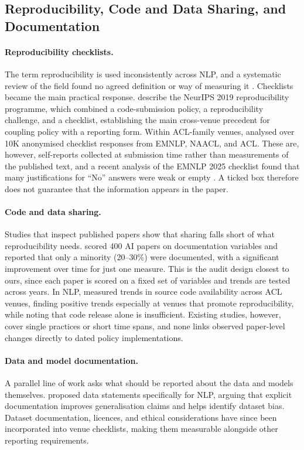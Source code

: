 \documentclass[11pt]{article}
\begin{document}
\subsection{Reproducibility, Code and Data Sharing, and Documentation}

\paragraph{Reproducibility checklists.}
The term reproducibility is used inconsistently across NLP, and a systematic review of the field found no agreed definition or way of measuring it \cite{belz2021systematic}. Checklists became the main practical response.  describe the NeurIPS 2019 reproducibility programme, which combined a code-submission policy, a reproducibility challenge, and a checklist, establishing the main cross-venue precedent for coupling policy with a reporting form. Within ACL-family venues,  analysed over 10K anonymised checklist responses from EMNLP, NAACL, and ACL. These are, however, self-reports collected at submission time rather than measurements of the published text, and a recent analysis of the EMNLP 2025 checklist found that many justifications for ``No'' answers were weak or empty \cite{jinnath2026aclresponsiblenlpchecklist}. A ticked box therefore does not guarantee that the information appears in the paper.

\paragraph{Code and data sharing.}
Studies that inspect published papers show that sharing falls short of what reproducibility needs.  scored 400 AI papers on documentation variables and reported that only a minority (20--30\%) were documented, with a significant improvement over time for just one measure. This is the audit design closest to ours, since each paper is scored on a fixed set of variables and trends are tested across years. In NLP,  measured trends in source code availability across ACL venues, finding positive trends especially at venues that promote reproducibility, while noting that code release alone is insufficient. Existing studies, however, cover single practices or short time spans, and none links observed paper-level changes directly to dated policy implementations.

\paragraph{Data and model documentation.}
A parallel line of work asks what should be reported about the data and models themselves.  proposed data statements specifically for NLP, arguing that explicit documentation improves generalisation claims and helps identify dataset bias. Dataset documentation, licences, and ethical considerations have since been incorporated into venue checklists, making them measurable alongside other reporting requirements.
\end{document}
